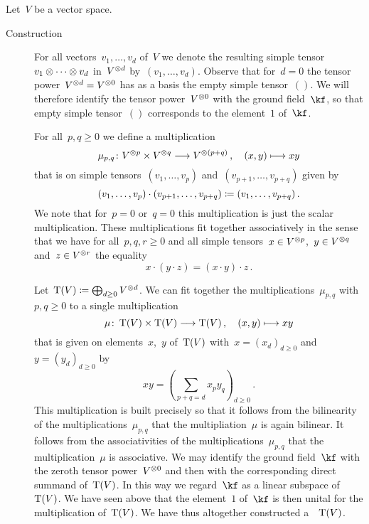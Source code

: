 \begin{recall}
  Let~$V$ be a vector space.
  \begin{description}
    \item[Construction]
      For all vectors~$v_1, \dotsc, v_d$ of~$V$ we denote the resulting simple tensor~$v_1 \otimes \dotsb \otimes v_d$ in~$V^{\otimes d}$ by~$(v_1, \dotsc, v_d)$.
      Observe that for~$d = 0$ the tensor power~$V^{\otimes d} = V^{\otimes 0}$ has as a basis the empty simple tensor~$()$.
      We will therefore identify the tensor power~$V^{\otimes 0}$ with the ground field~$\kf$, so that empty simple tensor~$()$ corresponds to the element~$1$ of~$\kf$.
      
      For all~$p, q \geq 0$ we define a multiplication
      \[
        \mu_{p,q}
        \colon
        V^{\tensor p} \times V^{\tensor q}
        \to
        V^{\tensor (p+q)} \,,
        \quad
        (x,y)
        \mapsto
        x y
      \]
      that is on simple tensors~$(v_1, \dotsc, v_p)$ and~$(v_{p+1}, \dotsc, v_{p+q})$ given by
      \[
        (v_1, \dotsc, v_p) \cdot (v_{p+1}, \dotsc, v_{p+q})
        \coloneqq
        (v_1, \dotsc, v_{p+q})  \,.
      \]
      We note that for~$p = 0$ or~$q = 0$ this multiplication is just the scalar multiplication.  
      These multiplications fit together associatively in the sense that we have for all~$p, q, r \geq 0$ and all simple tensors~$x \in V^{\otimes p}$,~$y \in V^{\otimes q}$ and~$z \in V^{\otimes r}$ the equality
      \[
        x \cdot (y \cdot z)
        =
        (x \cdot y) \cdot z \,.
      \]
      
      Let~$\operatorname{T}(V) \coloneqq \bigoplus_{d \geq 0} V^{\otimes d}$.
      We can fit together the multiplications~$\mu_{p,q}$ with~$p, q \geq 0$ to a single multiplication
      \[
        \mu
        \colon
        \Tensor(V) \times \Tensor(V)
        \to
        \Tensor(V)  \,,
        \quad
        (x,y)
        \mapsto
        xy 
      \]
      that is given on elements~$x$,~$y$ of~$\operatorname{T}(V)$ with~$x = (x_d)_{d \geq 0}$ and~$y = (y_d)_{d \geq 0}$ by
      \[
        x y
        =
        \left(
          \sum_{p+q = d} x_p y_q
        \right)_{d \geq 0} \,.
      \]
      This multiplication is built precisely so that it follows from the bilinearity of the multiplications~$\mu_{p,q}$ that the multipliation~$\mu$ is again bilinear.
      It follows from the associativities of the multiplications~$\mu_{p,q}$ that the multiplication~$\mu$ is associative.
      We may identify the ground field~$\kf$ with the zeroth tensor power~$V^{\otimes 0}$ and then with the corresponding direct summand of~$\operatorname{T}(V)$.
      In this way we regard~$\kf$ as a linear subspace of~$\operatorname{T}(V)$.
      We have seen above that the element~$1$ of~$\kf$ is then unital for the multiplication of~$\operatorname{T}(V)$.
      We have thus altogether constructed a~{\algebra{$\kf$}}~$\operatorname{T}(V)$.
      

\end{description}
\end{recall}
